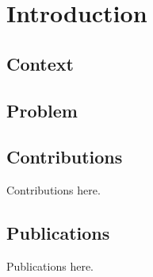 \chapter{Introduction}

\section{Context}

\section{Problem}

\section{Contributions}

Contributions here.

\section{Publications}

Publications here.